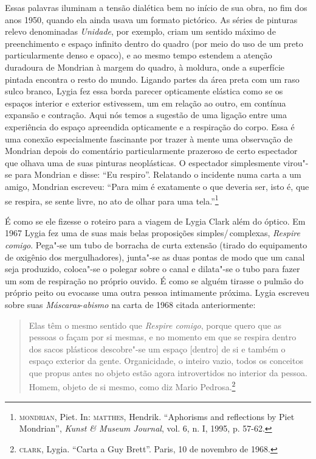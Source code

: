 \begin{multicols}{2}
Essas palavras iluminam a tensão dialética bem no início de sua obra, no
fim dos anos 1950, quando ela ainda usava um formato pictórico. As
séries de pinturas relevo denominadas \textit{Unidade}, por exemplo, criam
um sentido máximo de preenchimento e espaço infinito dentro do quadro
(por meio do uso de um preto particularmente denso e opaco), e ao mesmo
tempo estendem a atenção duradoura de Mondrian à margem do quadro, à
moldura, onde a superfície pintada encontra o resto do mundo. Ligando
partes da área preta com um raso sulco branco, Lygia fez essa borda
parecer opticamente elástica como se os espaços interior e exterior
estivessem, um em relação ao outro, em contínua expansão e contração.
Aqui nós temos a sugestão de uma ligação entre uma experiência do espaço
apreendida opticamente e a respiração do corpo. Essa é uma conexão
especialmente fascinante por trazer à mente uma observação de Mondrian
depois do comentário particularmente prazeroso de certo espectador que
olhava uma de suas pinturas neoplásticas. O espectador simplesmente
virou"-se para Mondrian e disse: ``Eu respiro''. Relatando o incidente numa
carta a um amigo, Mondrian escreveu: ``Para mim é exatamente o que
deveria ser, isto é, que se respira, se sente livre, no ato de olhar
para uma tela.''\footnote{\textsc{mondrian}, Piet. In: \textsc{matthes}, Hendrik. ``Aphorisms
  and reflections by Piet Mondrian'', \textit{Kunst \& Museum Journal},
  vol. 6, n. I, 1995, p. 57-62.}

É como se ele fizesse o roteiro para a viagem de Lygia Clark além do
óptico. Em 1967 Lygia fez uma de suas mais belas proposições
simples/\,complexas, \textit{Respire comigo}. Pega"-se um tubo de borracha de
curta extensão (tirado do equipamento de oxigênio dos mergulhadores),
junta"-se as duas pontas de modo que um canal seja produzido, coloca"-se o
polegar sobre o canal e dilata"-se o tubo para fazer um som de respiração
no próprio ouvido. É como se alguém tirasse o pulmão do próprio peito ou
evocasse uma outra pessoa intimamente próxima. Lygia escreveu sobre suas
\textit{Máscaras}-\textit{abismo} na carta de 1968 citada anteriormente:

\begin{quote}
Elas têm o mesmo sentido que \textit{Respire comigo}, porque quero que as
pessoas o façam por si mesmas, e no momento em que se respira dentro dos
sacos plásticos descobre"-se um espaço {[}dentro{]} de si e também o
espaço exterior da gente. Organicidade, o inteiro vazio, todos os
conceitos que propus antes no objeto estão agora introvertidos no
interior da pessoa. Homem, objeto de si mesmo, como diz Mario
Pedrosa.\footnote{\textsc{clark}, Lygia. ``Carta a Guy Brett''. Paris, 10 de
  novembro de 1968.}
\end{quote}


\end{multicols}
